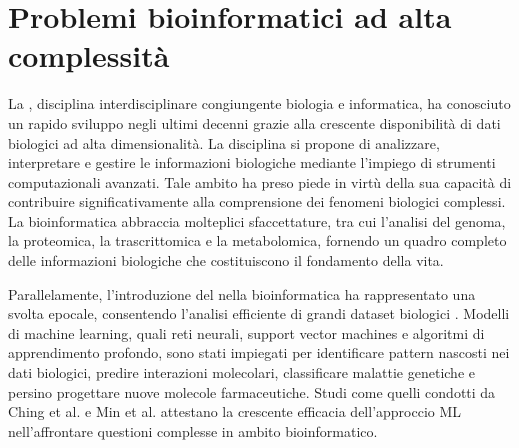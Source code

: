 % 
% 
% 



\clearpage
\cleardoublepage

\section{Problemi bioinformatici ad alta complessità}

La , disciplina interdisciplinare congiungente biologia e informatica, ha conosciuto un rapido sviluppo negli ultimi decenni grazie alla crescente disponibilità di dati biologici ad alta dimensionalità. La disciplina si propone di analizzare, interpretare e gestire le informazioni biologiche mediante l'impiego di strumenti computazionali avanzati. Tale ambito ha preso piede in virtù della sua capacità di contribuire significativamente alla comprensione dei fenomeni biologici complessi. La bioinformatica abbraccia molteplici sfaccettature, tra cui l'analisi del genoma, la proteomica, la trascrittomica e la metabolomica, fornendo un quadro completo delle informazioni biologiche che costituiscono il fondamento della vita.

Parallelamente, l'introduzione del  nella bioinformatica ha rappresentato una svolta epocale, consentendo l'analisi efficiente di grandi dataset biologici \cite{lecun2015deep, angermueller2016deep}. Modelli di machine learning, quali reti neurali, support vector machines e algoritmi di apprendimento profondo, sono stati impiegati per identificare pattern nascosti nei dati biologici, predire interazioni molecolari, classificare malattie genetiche e persino progettare nuove molecole farmaceutiche. Studi come quelli condotti da Ching et al. \cite{ching2018deep} e Min et al. \cite{min2017deep} attestano la crescente efficacia dell'approccio ML nell'affrontare questioni complesse in ambito bioinformatico.


